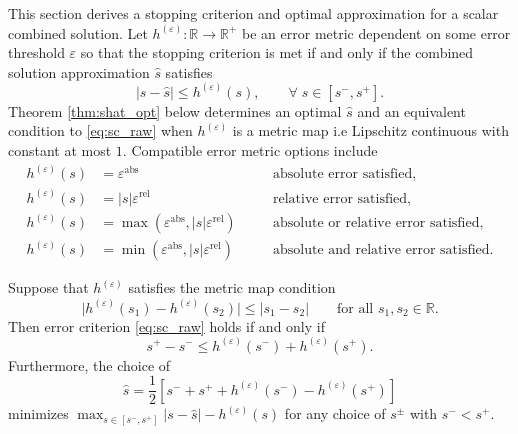 \documentclass[graybox]{svmult}
\begin{document}
This section derives a stopping criterion and optimal approximation for a scalar combined solution. Let $h^{(\varepsilon)}: \mathbb{R} \to \mathbb{R}^+$ be an error metric dependent on some error threshold $\varepsilon$ so that the stopping criterion is met if and only if the combined solution approximation $\hat{s}$ satisfies 
\begin{equation}
    \lvert s-\hat{s} \rvert \leq h^{(\varepsilon)}(s), \qquad \forall\; s \in [s^-,s^+].
    \label{eq:sc_raw}
\end{equation}
Theorem \ref{thm:shat_opt} below determines an optimal $\hat{s}$ and an equivalent condition to \eqref{eq:sc_raw} when $h^{(\varepsilon)}$ is a metric map i.e Lipschitz continuous with constant at most $1$. Compatible error metric options include
\begin{subequations}
\begin{align}
    h^{(\varepsilon)}(s) & = \varepsilon^\text{abs} \quad &&\text{absolute error satisfied}, \label{eq:h_abs}\\
    h^{(\varepsilon)}(s) & = \lvert s \rvert \varepsilon^\text{rel} \quad &&\text{relative error satisfied}, \label{eq:h_rel}\\
    h^{(\varepsilon)}(s) &= \max\left(\varepsilon^\text{abs},\lvert s \rvert \varepsilon^\text{rel} \right) \quad &&\text{absolute or relative error satisfied,} \label{eq:h_abs_or_rel} \\
    h^{(\varepsilon)}(s) &= \min\left(\varepsilon^\text{abs},\lvert s \rvert \varepsilon^\text{rel} \right) \quad &&\text{absolute and relative error satisfied.} \label{eq:h_abs_and_rel}
\end{align}
\end{subequations}
\begin{theorem} \label{thm:shat_opt}
    Suppose that  $h^{(\varepsilon)}$ satisfies the metric map condition
    $$\lvert h^{(\varepsilon)}(s_1) - h^{(\varepsilon)}(s_2) \rvert \leq \lvert s_1 - s_2 \rvert \qquad \text{for all } s_1,s_2 \in \mathbb{R}.$$
    Then error criterion  \eqref{eq:sc_raw} holds if and only if 
    \begin{equation}
        s^+-s^- \leq h^{(\varepsilon)}(s^-)+h^{(\varepsilon)}(s^+).
        \label{eq:sc}
    \end{equation}
    Furthermore, the choice of 
    \begin{equation}
        \hat{s} = \frac{1}{2}\left[s^-+s^++h^{(\varepsilon)}(s^-)-h^{(\varepsilon)}(s^+)\right]
        \label{eq:shat_opt}
    \end{equation}
    minimizes $\max_{s \in [s^-,s^+]} \lvert s - \hat{s} \rvert -h^{(\varepsilon)}(s)$ for any choice of $s^{\pm}$ with $s^- < s^+$.
\end{theorem}
\end{document}
